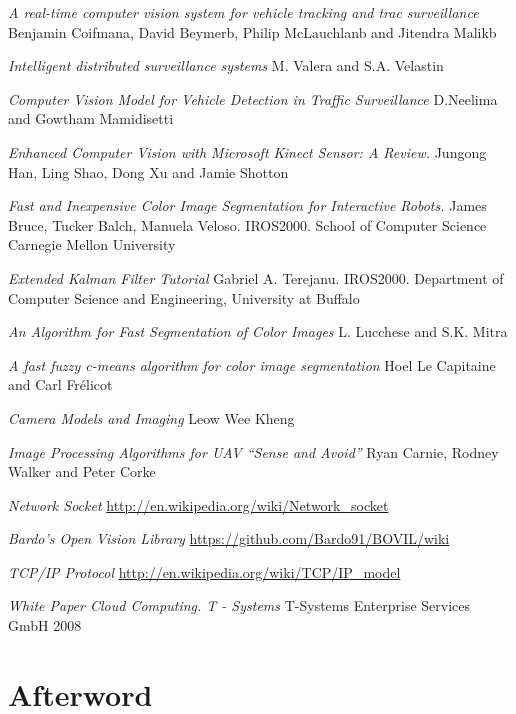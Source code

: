 \documentclass{book} %
\begin{document}
\begin{thebibliography}{9}

 \textit{A real-time computer vision system for vehicle tracking
and trac surveillance} Benjamin Coifmana, David Beymerb, Philip McLauchlanb and Jitendra Malikb

 \textit{Intelligent distributed surveillance systems} M. Valera and S.A. Velastin

 \textit{Computer Vision Model for Vehicle Detection in Traffic Surveillance} D.Neelima and Gowtham Mamidisetti

 \textit{Enhanced Computer Vision with Microsoft Kinect Sensor: A Review.} Jungong Han, Ling Shao, Dong Xu and Jamie Shotton

 \textit{Fast and Inexpensive Color Image Segmentation for Interactive Robots.} James Bruce, Tucker Balch, Manuela Veloso. IROS2000. School of Computer Science Carnegie Mellon University

 \textit{Extended Kalman Filter Tutorial} Gabriel A. Terejanu. IROS2000. Department of Computer Science and Engineering, University at Buffalo

 \textit{An Algorithm for Fast Segmentation of Color Images} L. Lucchese and S.K. Mitra

 \textit{A fast fuzzy c-means algorithm for color image segmentation} Hoel Le Capitaine and Carl Frélicot

 \textit{Camera Models and Imaging} Leow Wee Kheng

 \textit{Image Processing Algorithms for UAV “Sense and Avoid”}  Ryan Carnie, Rodney Walker and Peter Corke

 \textit{Network Socket} \url{http://en.wikipedia.org/wiki/Network_socket}

 \textit{Bardo's Open Vision Library} \url{https://github.com/Bardo91/BOVIL/wiki}

 \textit{TCP/IP Protocol}  \url{http://en.wikipedia.org/wiki/TCP/IP_model}

 \textit{White Paper Cloud Computing. T - Systems} T-Systems Enterprise Services GmbH 2008
\end{thebibliography}

\backmatter

\chapter{Afterword}
\end{document}
